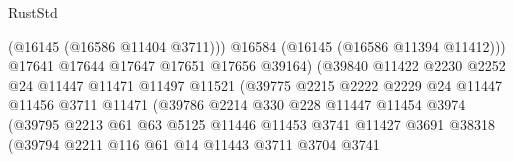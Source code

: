 \begin{lexlean}{RustStd}
\begin{coremodule}
                                          (@16145 (@16586 @11404 @3711)))
                                        @16584
                                        (@16145 (@16586 @11394 @11412)))
                                      @17641
                                      @17644
                                      @17647
                                      @17651
                                      @17656
                                      @39164)
                                    (@39840
                                      @11422
                                      @2230
                                      @2252
                                      @24
                                      @11447
                                      @11471
                                      @11497
                                      @11521
                                      (@39775
                                        @2215
                                        @2222
                                        @2229
                                        @24
                                        @11447
                                        @11456
                                        @3711
                                        @11471
                                        (@39786
                                          @2214
                                          @330
                                          @228
                                          @11447
                                          @11454
                                          @3974
                                          (@39795
                                            @2213
                                            @61
                                            @63
                                            @5125
                                            @11446
                                            @11453
                                            @3741
                                            @11427
                                            @3691
                                            @38318
                                            (@39794
                                              @2211
                                              @116
                                              @61
                                              @14
                                              @11443
                                              @3711
                                              @3704
                                              @3741

\end{coremodule}
\end{lexlean}
